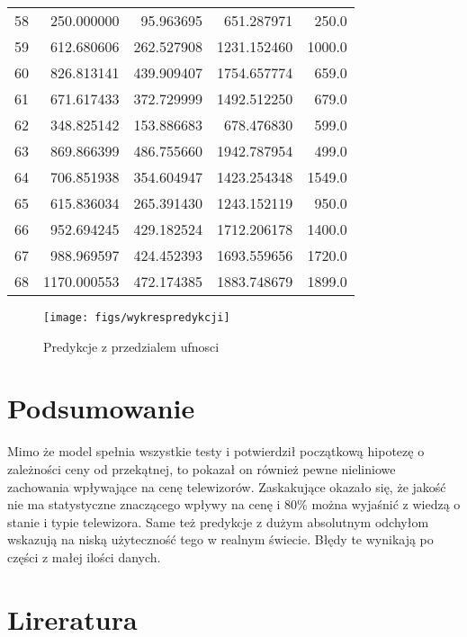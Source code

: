 \documentclass[11pt,a4paper]{article}
\begin{document}
\begin{tabular}{lrrrr}
		58 &       250.000000 &    95.963695 &    651.287971 &      250.0 \\
		59 &       612.680606 &   262.527908 &   1231.152460 &     1000.0 \\
		60 &       826.813141 &   439.909407 &   1754.657774 &      659.0 \\
		61 &       671.617433 &   372.729999 &   1492.512250 &      679.0 \\
		62 &       348.825142 &   153.886683 &    678.476830 &      599.0 \\
		63 &       869.866399 &   486.755660 &   1942.787954 &      499.0 \\
		64 &       706.851938 &   354.604947 &   1423.254348 &     1549.0 \\
		65 &       615.836034 &   265.391430 &   1243.152119 &      950.0 \\
		66 &       952.694245 &   429.182524 &   1712.206178 &     1400.0 \\
		67 &       988.969597 &   424.452393 &   1693.559656 &     1720.0 \\
		68 &      1170.000553 &   472.174385 &   1883.748679 &     1899.0 \\
	
	\end{tabular}
	
	\begin{figure}
		\centering
		\texttt{[image: figs/wykrespredykcji]}
		\caption[pred]{Predykcje z przedzialem ufnosci}
		\label{fig:wykrespredykcji}
	\end{figure}
	

\section{Podsumowanie}
	Mimo że model spełnia wszystkie testy i potwierdził początkową hipotezę o zależności ceny od przekątnej, to pokazał on również pewne nieliniowe zachowania wpływające na cenę telewizorów. Zaskakujące okazało się, że jakość nie ma statystyczne znaczącego wpływy na cenę i 80\% można wyjaśnić z wiedzą o stanie i typie telewizora. Same też predykcje z dużym absolutnym odchyłom wskazują na niską użyteczność tego w realnym świecie. Błędy te wynikają po części z małej ilości danych.
\section{Lireratura}

	
\end{document}
